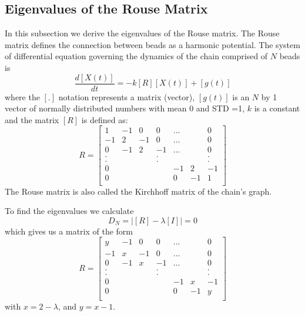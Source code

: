 \documentclass{paper}
\begin{document}
\subsection{Eigenvalues of the Rouse Matrix}\label{subsection_eigenvaluesOfTheRouseMatrix}
In this subsection we derive the eigenvalues of the Rouse matrix. The Rouse matrix defines the connection between beads as a harmonic potential. The system of differential equation governing the dynamics of the chain comprised of $N$ beads is 
\begin{equation}
\frac{d[X(t)]}{dt}=-k[R][X(t)]+[g(t)]
\end{equation}
where the $[.]$ notation represents a matrix (vector), $[g(t)]$ is an $N$ by 1 vector of normally distributed numbers with mean 0 and STD =1, $k$ is a constant and the matrix $[R]$ is defined as:
\begin{equation}
R=\left[
\begin{matrix}
 1 & -1 &  0 &  0 &...&  &  0 \\
-1 &  2 & -1 &  0 &...&  &  0 \\
 0 & -1 &  2 & -1 &...&  &  0 \\
 . &    &    &  . &   &  &  . \\
 . &    &    &  . &   &  &  . \\
 0 &    &    &    & -1& 2& -1 \\
 0 &    &    &    &  0&-1&  1 \\     
\end{matrix}
\right]
\end{equation}
The Rouse matrix is also called the Kirchhoff matrix of the chain's graph.

To find the eigenvalues we calculate 
\begin{equation*}
D_N=\left|[R]-\lambda[I]\right|=0
\end{equation*}
which gives us a matrix of the form 
\begin{equation*}
R=\left[
\begin{matrix}
 y & -1 &  0 &  0 &...&  &  0 \\
-1 &  x & -1 &  0 &...&  &  0 \\
 0 & -1 &  x & -1 &...&  &  0 \\
 . &    &    &  . &   &  &  . \\
 . &    &    &  . &   &  &  . \\
 0 &    &    &    & -1& x& -1 \\
 0 &    &    &    &  0&-1&  y \\     
\end{matrix}
\right]
\end{equation*}
with $x=2-\lambda$, and $y=x-1$.
\end{document}
